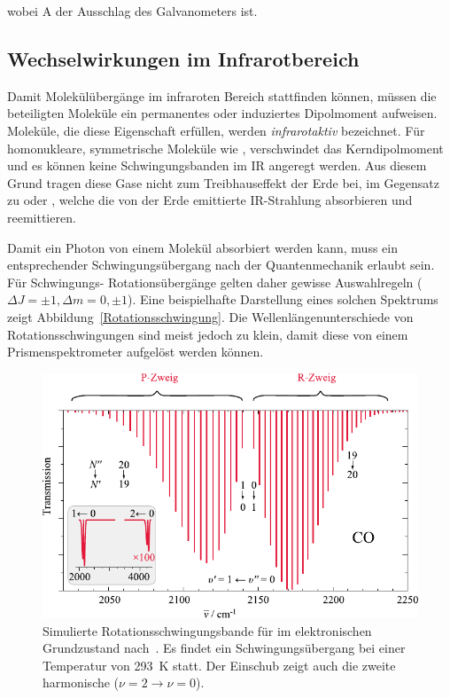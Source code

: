 \documentclass[a4paper,twoside,final]{article}
\begin{document}
wobei A der Ausschlag des Galvanometers ist.

\subsection{Wechselwirkungen im Infrarotbereich}\label{sec:Wechselwirkungen}

Damit Molekülübergänge im infraroten Bereich stattfinden können, müssen die beteiligten Moleküle ein permanentes oder induziertes Dipolmoment aufweisen. Moleküle, die diese Eigenschaft erfüllen, werden \emph{infrarotaktiv} bezeichnet. Für homonukleare, symmetrische Moleküle wie ,  verschwindet das Kerndipolmoment und es können keine Schwingungsbanden im IR angeregt werden. Aus diesem Grund tragen diese Gase nicht zum Treibhauseffekt der Erde bei, im Gegensatz zu  oder , welche die von der Erde emittierte IR-Strahlung absorbieren und reemittieren.

Damit ein Photon von einem Molekül absorbiert werden kann, muss ein entsprechender Schwingungsübergang nach der Quantenmechanik erlaubt sein. Für Schwingungs- Rotationsübergänge gelten daher gewisse Auswahlregeln ($\Delta J = \pm 1, \Delta m = 0, \pm 1$). Eine beispielhafte Darstellung eines solchen Spektrums zeigt Abbildung~\ref{Rotationsschwingung}. Die Wellenlängenunterschiede von Rotationsschwingungen sind meist jedoch zu klein, damit diese von einem Prismenspektrometer aufgelöst werden können.

\begin{figure}[htp]
  \centering
  \includegraphics{Bilder/Rotationsschwingung.pdf}
  \caption{Simulierte Rotationsschwingungsbande für  im elektronischen Grundzustand nach~\cite{Hertel}. Es findet ein Schwingungsübergang bei einer Temperatur von \SI{293}{\kelvin} statt. Der Einschub zeigt auch die zweite harmonische ($\nu=2 \to \nu=0$).}
\end{figure}
\end{document}
